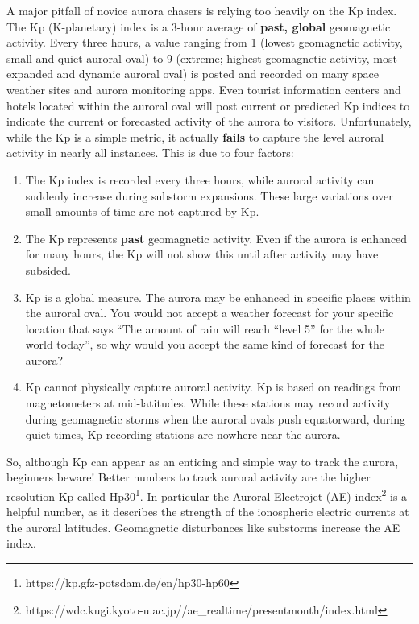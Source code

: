 \documentclass{article}
\begin{document}
A major pitfall of novice aurora chasers is relying too heavily on the Kp index. The Kp (K-planetary) index is a 3-hour average of \textbf{past, global} geomagnetic activity. Every three hours, a value ranging from 1 (lowest geomagnetic activity, small and quiet auroral oval) to 9 (extreme; highest geomagnetic activity, most expanded and dynamic auroral oval) is posted and recorded on many space weather sites and aurora monitoring apps. Even tourist information centers and hotels located within the auroral oval will post current or predicted Kp indices to indicate the current or forecasted activity of the aurora to visitors. Unfortunately, while the Kp is a simple metric, it actually \textbf{fails} to capture the level auroral activity in nearly all instances. This is due to four factors:
\begin{enumerate}
    \item The Kp index is recorded every three hours, while auroral activity can suddenly increase during substorm expansions. These large variations over small amounts of time are not captured by Kp.
    \item The Kp represents \textbf{past} geomagnetic activity. Even if the aurora is enhanced for many hours, the Kp will not show this until after activity may have subsided.
    \item Kp is a global measure. The aurora may be enhanced in specific places within the auroral oval. You would not accept a weather forecast for your specific location that says ``The amount of rain will reach ``level 5'' for the whole world today'', so why would you accept the same kind of forecast for the aurora?
    \item Kp cannot physically capture auroral activity. Kp is based on readings from magnetometers at mid-latitudes. While these stations may record activity during geomagnetic storms when the auroral ovals push equatorward, during quiet times, Kp recording stations are nowhere near the aurora.
\end{enumerate}
So, although Kp can appear as an enticing and simple way to track the aurora, beginners beware! 
Better numbers to track auroral activity are the higher resolution Kp called \href{https://kp.gfz-potsdam.de/en/hp30-hp60}{Hp30}\footnote{https://kp.gfz-potsdam.de/en/hp30-hp60}. In particular \href{http://wdc.kugi.kyoto-u.ac.jp/ae_realtime/presentmonth/index.html}{the Auroral Electrojet (AE) index}\footnote{https://wdc.kugi.kyoto-u.ac.jp//ae\_realtime/presentmonth/index.html} is a helpful number, as it describes the strength of the ionospheric electric currents at the auroral latitudes. Geomagnetic disturbances like substorms increase the AE index.
\end{document}
